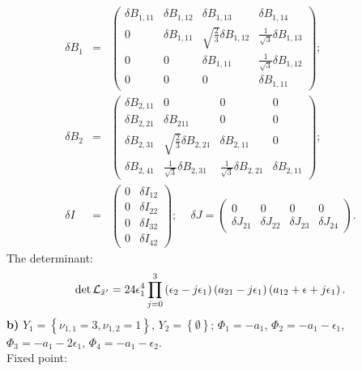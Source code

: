 \documentclass[a4paper,12pt]{article}
\begin{document}
\begin{eqnarray}
\delta B_1 &=& \left(\begin{array}{cccc} \delta B_{1,11} & \delta B_{1,12} & \delta B_{1,13} & \delta B_{1,14}\\
0 & \delta B_{1,11} & \sqrt{\frac{2}{3}}\delta B_{1,12} &
\frac{1}{\sqrt{3}} \delta B_{1,13} \\ 0 & 0 & \delta B_{1,11} &
\frac{1}{\sqrt{3}} \delta B_{1,12} \\ 0 & 0 & 0 & \delta B_{1,11}
\end{array}\right); \nonumber \\
\delta B_2 &=& \left(\begin{array}{cccc} \delta B_{2,11} & 0 & 0 & 0 \\ \delta B_{2,21} & \delta B_{211} & 0 & 0 \\
\delta B_{2,31} & \sqrt{\frac{2}{3}} \delta B_{2,21} & \delta B_{2,11} & 0 \\
\delta B_{2,41} & \frac{1}{\sqrt{3}} \delta B_{2,31} & \frac{1}{\sqrt{3}} \delta B_{2,21} & \delta B_{2,11}
\end{array}\right); \nonumber \\
\delta I &=& \left(\begin{array}{cc} 0 & \delta I_{12} \\ 0 & \delta I_{22} \\ 0 & \delta I_{32} \\ 0 & \delta
I_{42}
\end{array}\right); \, \, \, \, \, \, \,
\delta J=\left(\begin{array}{cccc} 0 & 0 & 0 & 0 \\ \delta J_{21} & \delta J_{22} & \delta J_{23} & \delta
J_{24}
\end{array}\right).
\end{eqnarray}
The determinant:
\begin{eqnarray}
\det {\cal L}_{{\tilde x}'}=24 \epsilon_1^4 \prod_{j=0}^3
\left(\epsilon_2-j\epsilon_1 \right) \left(a_{21}-j\epsilon_1
\right) \left(a_{12}+ \epsilon +j \epsilon_1 \right).
\end{eqnarray}
{\bf b)} $Y_1=\left\{\nu_{1,1}=3, \nu_{1,2}=1 \right\}$,
$Y_2=\left\{\emptyset\right\}$; $\Phi_1=-a_1$,
$\Phi_2=-a_1-\epsilon_1$,
$\Phi_3=-a_1-2\epsilon_1$, $\Phi_4=-a_1-\epsilon_2$. \\
Fixed point:
\end{document}
